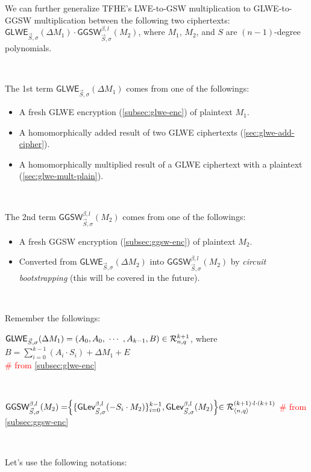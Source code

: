 We can further generalize TFHE's LWE-to-GSW multiplication to GLWE-to-GGSW multiplication between the following two ciphertexts: $\textsf{GLWE}_{\vec{S}, \sigma}(\Delta M_1) \cdot \textsf{GGSW}_{\vec{S}, \sigma}^{\beta, l}(M_2)$, where $M_1$, $M_2$, and $S$ are $(n-1)$-degree polynomials. 


$ $

\noindent The 1st term $\textsf{GLWE}_{\vec{S}, \sigma}(\Delta M_1)$ comes from one of the followings: 
\begin{itemize}
\item A fresh GLWE encryption (\autoref{subsec:glwe-enc}) of plaintext $M_1$. 
\item A homomorphically added result of two GLWE ciphertexts (\autoref{sec:glwe-add-cipher}). 
\item A homomorphically multiplied result of a GLWE ciphertext with a plaintext (\autoref{sec:glwe-mult-plain}). 
\end{itemize}

$ $

\noindent The 2nd term $\textsf{GGSW}_{\vec{S}, \sigma}^{\beta, l}(M_2)$ comes from one of the followings:
\begin{itemize}
\item A fresh GGSW encryption (\autoref{subsec:ggsw-enc}) of plaintext $M_2$.
\item Converted from $\textsf{GLWE}_{\vec{S}, \sigma}(\Delta M_2)$ into $\textsf{GGSW}_{\vec{S}, \sigma}^{\beta, l}(M_2)$ by \textit{circuit bootstrapping} (this will be covered in the future).
\end{itemize}

$ $

\noindent Remember the followings: 

$\textsf{GLWE}_{\vec{S}, \sigma}(\Delta M_1) = (A_0, A_0, \text{ } \text{$\cdots$} \text{ }, A_{k-1}, B) \in \mathcal{R}_{n, q}^{k + 1}$, where $B = \sum\limits_{i=0}^{k-1}(A_i \cdot S_i) + \Delta M_1 + E$ \\ \textcolor{red}{\# from \autoref{subsec:glwe-enc}} 

$ $

$\textsf{GGSW}_{\vec{S}, \sigma}^{\beta, l}(M_2) = \Bigr \{ \{ \textsf{GLev}_{\vec{S}, \sigma}^{\beta, l} (-S_i \cdot M_2)  \}_{i=0}^{k-1}, \textsf{GLev}_{\vec{S}, \sigma}^{\beta, l}(M_2) \Bigl \} \in \mathcal{R}_{\langle n, q \rangle }^{(k+1) \cdot l \cdot (k+1)}$ \textcolor{red}{\# from \autoref{subsec:ggsw-enc}}

$ $

\noindent Let's use the following notations:

